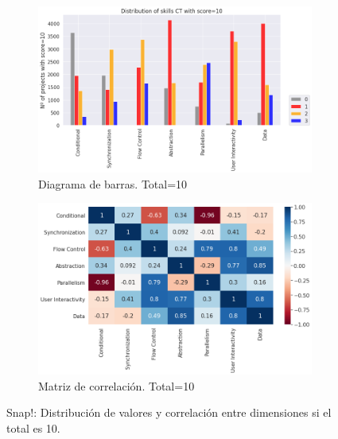 \documentclass[a4paper, 12pt]{book}
\begin{document}
\begin{figure}[H]
    \centering
    \begin{subfigure}[h]{.49\textwidth} 
        \includegraphics[width=\textwidth]{img/distribucion_10_Snap}
        \caption{Diagrama de barras. Total=10}
        \label{fig:total10_Snap}
    \end{subfigure}       
    \begin{subfigure}[h]{.49\textwidth} 
        \includegraphics[width=\textwidth]{img/corr_10_Snap}
        \caption{Matriz de correlación. Total=10}
        \label{fig:corr10_Snap}
    \end{subfigure}
    \caption{Snap!: Distribución de valores y correlación entre dimensiones si el total es 10.}
\end{figure}
\end{document}

